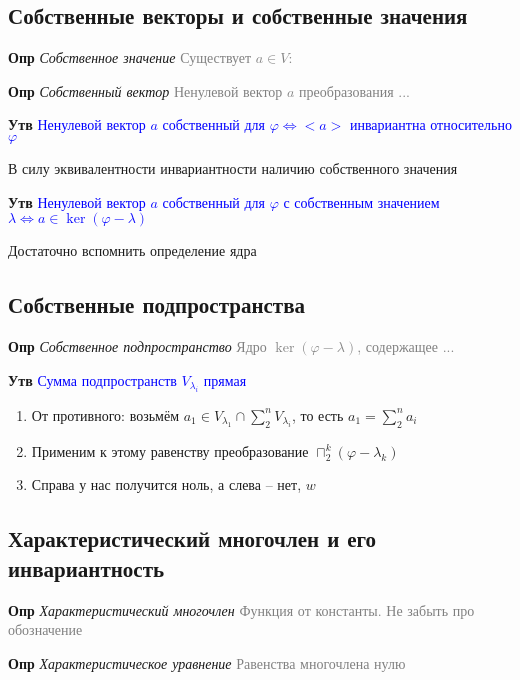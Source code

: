 \subsection{Собственные векторы и собственные значения}

\textbf{Опр} \textit{Собственное значение} \textcolor{gray}{Существует $a \in V:$}

\textbf{Опр} \textit{Собственный вектор} \textcolor{gray}{Ненулевой вектор $a$ преобразования ...}

\textbf{Утв} \textcolor{blue}{Ненулевой вектор $a$ собственный для $\varphi \Leftrightarrow <a>$ инвариантна
относительно $\varphi$}

В силу эквивалентности инвариантности наличию собственного значения

\textbf{Утв} \textcolor{blue}{Ненулевой вектор $a$ собственный для $\varphi$ с собственным
значением $\lambda \Leftrightarrow a \in \ker (\varphi - \lambda)$}

Достаточно вспомнить определение ядра

\subsection{Собственные подпространства}

\textbf{Опр} \textit{Собственное подпространство} \textcolor{gray}{Ядро $\ker (\varphi - \lambda)$, содержащее ...}

\textbf{Утв} \textcolor{blue}{Сумма подпространств $V_{\lambda_i}$ прямая}

\begin{enumerate}
    \item От противного: возьмём $a_1 \in V_{\lambda_1} \cap \sum_2^n V_{\lambda_i}$, то есть $a_1 = \sum_2^n a_i$
    \item Применим к этому равенству преобразование $\sqcap_2^k (\varphi - \lambda_k)$
    \item Справа у нас получится ноль, а слева -- нет, $w$
\end{enumerate}

\subsection{Характеристический многочлен и его инвариантность}

\textbf{Опр} \textit{Характеристический многочлен} \textcolor{gray}{Функция от константы. Не забыть про обозначение}

\textbf{Опр} \textit{Характеристическое уравнение} \textcolor{gray}{Равенства многочлена нулю}


